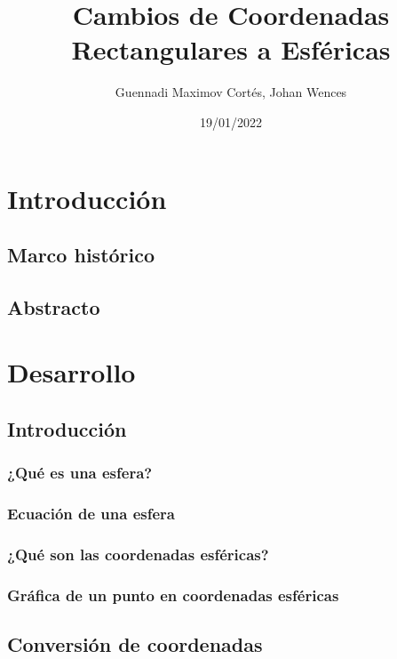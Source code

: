 \documentclass[letterpaper,14pt]{extreport} %
\title{Cambios de Coordenadas Rectangulares a Esféricas} %
\author{Guennadi Maximov Cortés, Johan Wences} %
\date{19/01/2022} %
\begin{document}
  \maketitle
  \tableofcontents
  \newpage
  
  \chapter{Introducción}
    
  \section{Marco histórico}
    
  \section{Abstracto}
    
  
  \chapter{Desarrollo}
    \renewcommand{\chaptername}{Jornada}
    
  \section{Introducción}
    \subsection{¿Qué es una esfera?}
        
    \subsection{Ecuación de una esfera}
        
    \subsection{¿Qué son las coordenadas esféricas?}
        
    \subsection{Gráfica de un punto en coordenadas esféricas}
        
  \section{Conversión de coordenadas}
\end{document}
